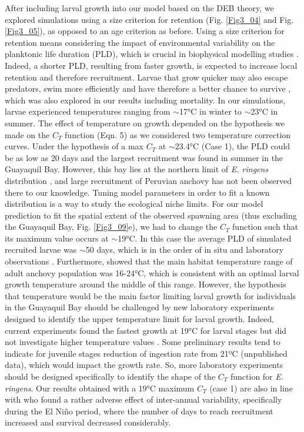 After including larval growth into our model based on the DEB theory, we explored simulations using a size criterion for retention (Fig. \ref{Fig3_04} and Fig. \ref{Fig3_05}), as opposed to an age criterion as before. Using a size criterion for retention means considering the impact of environmental variability on the planktonic life duration (PLD), which is crucial in biophysical modelling studies \citep{Lett2010}. Indeed, a shorter PLD, resulting from faster growth, is expected to increase local retention and therefore recruitment. Larvae that grow quicker may also escape predators, swim more efficiently and have therefore a better chance to survive \citep{Houd2008}, which was also explored in our results including mortality. In our simulations, larvae experienced temperatures ranging from $\sim$17°C in winter to $\sim$23°C in summer. The effect of temperature on growth depended on the hypothesis we made on the $C_T$ function (Eqn. 5) as we considered two temperature correction curves. Under the hypothesis of a max $C_T$ at $\sim$23.4°C (Case 1), the PLD could be as low as 20 days and the largest recruitment was found in summer in the Guayaquil Bay. However, this bay lies at the northern limit of \textit{E. ringens} distribution \citep{CaldAyor2020}, and large recruitment of Peruvian anchovy has not been observed there to our knowledge. Tuning model parameters in order to fit a known distribution is a way to study the ecological niche limits. For our model prediction to fit the spatial extent of the observed spawning area (thus excluding the Guayaquil Bay, Fig. \ref{Fig3_09}e), we had to change the $C_T$ function such that its maximum value occurs at $\sim$19°C. In this case the average PLD of simulated recruited larvae was $\sim$50 days, which is in the order of in situ and laboratory observations \citep{PaloMuck1987}. Furthermore, \citep{CastPena2022} showed that the main habitat temperature range of adult anchovy population was 16-24°C, which is consistent with an optimal larval growth temperature around the middle of this range. However, the hypothesis that temperature would be the main factor limiting larval growth for individuals in the Guayaquil Bay should be challenged by new laboratory experiments designed to identify the upper temperature limit for larval growth. Indeed, current experiments found the fastest growth at 19°C for larval stages but did not investigate higher temperature values \citep{RiouOfel2021}. Some preliminary results tend to indicate for juvenile stages reduction of ingestion rate from 21ºC (unpublished data), which would impact the growth rate. So, more laboratory experiments should be designed specifically to identify the shape of the $C_T$ function for \textit{E. ringens}. Our results obtained with a 19°C maximum $C_T$ (case 1) are also in line with \cite{XuChai2013} who found a rather adverse effect of inter-annual variability, specifically during the El Niño period, where the number of days to reach recruitment increased and survival decreased considerably.\\

